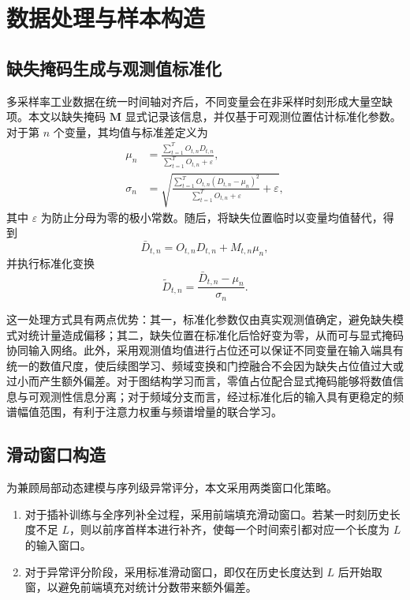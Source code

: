 \documentclass[bachelor, vlined]{DissertUESTC}
\begin{document}
    \section{数据处理与样本构造}
    
    \subsection{缺失掩码生成与观测值标准化}
    
    多采样率工业数据在统一时间轴对齐后，不同变量会在非采样时刻形成大量空缺项。本文以缺失掩码 $\mathbf{M}$ 显式记录该信息，并仅基于可观测位置估计标准化参数。对于第 $n$ 个变量，其均值与标准差定义为
    \begin{align}
        \mu_n &= \frac{\sum_{t=1}^{T} O_{t,n} D_{t,n}}{\sum_{t=1}^{T} O_{t,n} + \varepsilon}, \\
        \sigma_n &= \sqrt{\frac{\sum_{t=1}^{T} O_{t,n}(D_{t,n}-\mu_n)^2}{\sum_{t=1}^{T} O_{t,n} + \varepsilon} + \varepsilon},
    \end{align}
    其中 $\varepsilon$ 为防止分母为零的极小常数。随后，将缺失位置临时以变量均值替代，得到
    \begin{equation}
        \bar{D}_{t,n} = O_{t,n} D_{t,n} + M_{t,n} \mu_n,
    \end{equation}
    并执行标准化变换
    \begin{equation}
        \tilde{D}_{t,n} = \frac{\bar{D}_{t,n}-\mu_n}{\sigma_n}.
    \end{equation}
    
    这一处理方式具有两点优势：其一，标准化参数仅由真实观测值确定，避免缺失模式对统计量造成偏移；其二，缺失位置在标准化后恰好变为零，从而可与显式掩码协同输入网络。此外，采用观测值均值进行占位还可以保证不同变量在输入端具有统一的数值尺度，使后续图学习、频域变换和门控融合不会因为缺失占位值过大或过小而产生额外偏差。对于图结构学习而言，零值占位配合显式掩码能够将数值信息与可观测性信息分离；对于频域分支而言，经过标准化后的输入具有更稳定的频谱幅值范围，有利于注意力权重与频谱增量的联合学习。
    
    \subsection{滑动窗口构造}
    
    为兼顾局部动态建模与序列级异常评分，本文采用两类窗口化策略。
    
    \begin{enumerate}
        \item 对于插补训练与全序列补全过程，采用前端填充滑动窗口。若某一时刻历史长度不足 $L$，则以前序首样本进行补齐，使每一个时间索引都对应一个长度为 $L$ 的输入窗口。
        \item 对于异常评分阶段，采用标准滑动窗口，即仅在历史长度达到 $L$ 后开始取窗，以避免前端填充对统计分数带来额外偏差。
    \end{enumerate}
    
\end{document}
